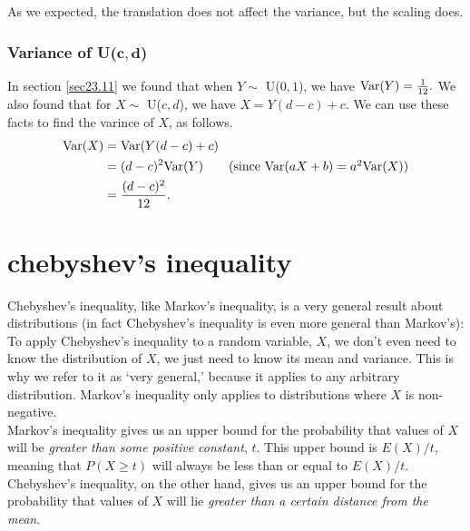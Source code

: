   	\bigskip
	
	\hfil{}
	\bigskip
	\bigskip
	
\noindent As we expected, the translation does not affect the variance, but the scaling does.

\subsubsection{Variance of U($\boldsymbol{c,d}$)}
In section \ref{sec23.11} we found that when $Y \sim$ U($0,1$), we have $\text{Var}(Y) = \frac{1}{12}.$ We also found that for $X \sim$ U($c,d$), we have $X = Y(d-c) + c$. We can use these facts to find the varince of $X$, as follows.
\begin{align*}
\Var(X) & = \Var(Y(d-c) + c) \\
	 & = (d-c)^2\Var(Y) \tag{since $\Var(aX+b) = a^2\Var(X)$} \\
	 & = \frac{(d-c)^2}{12}.
\end{align*}

\section{chebyshev's inequality} \label{chebyshevs ineq}
Chebyshev's inequality, like Markov's inequality, is a very general result about distributions (in fact Chebyshev's inequality is even more general than Markov's): To apply Chebyshev's inequality to a random variable, $X$, we don't even need to know the distribution of $X$, we just need to know its mean and variance. This is why we refer to it as `very general,' because it applies to any arbitrary distribution. Markov's inequality only applies to distributions where $X$ is non-negative. \\

\noindent Markov's inequality gives us an upper bound for the probability that values of $X$ will be \textit{greater than some positive constant}, $t$. This upper bound is $E(X)/t$, meaning that $P(X \geq t)$ will always be less than or equal to $E(X)/t$. \\

\noindent Chebyshev's inequality, on the other hand, gives us an upper bound for the probability that values of $X$ will lie \textit{greater than a certain distance from the mean}. \\

